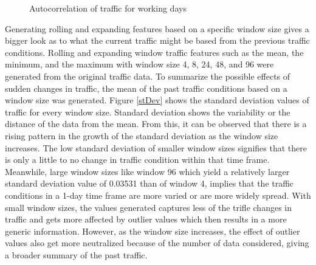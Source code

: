 \begin{figure}[h] 
\centering
  \centering
  \caption{Autocorrelation of traffic for working days}
  \label{autocorr_whyRE}
\end{figure}


Generating rolling and expanding features based on a specific window size gives a bigger look as to what the current traffic might be based from the previous traffic conditions. Rolling and expanding window traffic features such as the mean, the minimum, and the maximum with window size  4, 8, 24, 48, and 96 were generated from the original traffic data. To summarize the possible effects of sudden changes in traffic, the mean of the past traffic conditions based on a window size was generated. Figure \ref{stDev} shows the standard deviation values of traffic for every window size. Standard deviation shows the variability or the distance of the data from the mean. From this, it can be observed that there is a rising pattern in the growth of the standard deviation as the window size increases. The low standard deviation of smaller window sizes signifies that there is only a little to no change in traffic condition within that time frame. Meanwhile, large window sizes like window 96 which yield a relatively larger standard deviation value of 0.03531 than of window 4, implies that the traffic conditions in a 1-day time frame are more varied or are more widely spread. With small window sizes, the values generated captures less of the trifle changes in traffic and gets more affected by outlier values which then results in a more generic information. However, as the window size increases, the effect of outlier values also get more neutralized because of the number of data considered, giving a broader summary of the past traffic. 

